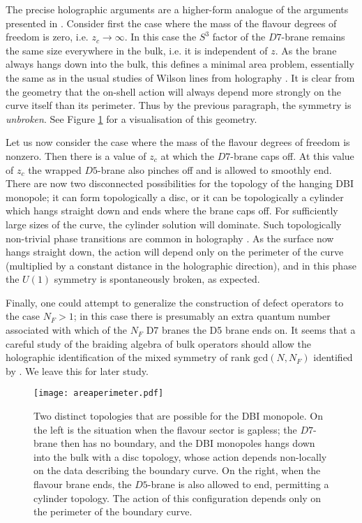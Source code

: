 \documentclass[aps,preprint,nofootinbib,preprintnumbers,eqsecnum,superscriptaddress]{revtex4}
\begin{document}
The precise holographic arguments are a higher-form analogue of the arguments presented in \cite{Iqbal:2014cga}. Consider first the case where the mass of the flavour degrees of freedom is zero, i.e.  $z_c \to \infty$. In this case the $S^3$ factor of the $D7$-brane remains the same size everywhere in the bulk, i.e. it is independent of $z$. As the brane always hangs down into the bulk, this defines a minimal area problem, essentially the same as in the usual studies of Wilson lines from holography \cite{Maldacena:1998im}. It is clear from the geometry that the on-shell action will always depend more strongly on the curve itself than its perimeter. Thus by the previous paragraph, the symmetry is {\it unbroken}. See Figure \ref{fig:areaperimeter} for a visualisation of this geometry. 


Let us now consider the case where the mass of the flavour degrees of freedom is nonzero. Then there is a value of $z_c$ at which the $D7$-brane caps off.  At this value of $z_c$ the wrapped $D5$-brane also pinches off and is allowed to smoothly end. There are now two disconnected possibilities for the topology of the hanging DBI monopole; it can form topologically a disc, or it can be topologically a cylinder which hangs straight down and ends where the brane caps off. For sufficiently large sizes of the curve, the cylinder solution will dominate. Such topologically non-trivial phase transitions are common in holography \cite{Brandhuber:1998bs,Rey:1998bq,Klebanov:2007ws}. As the surface now hangs straight down, the action will depend only on the perimeter of the curve (multiplied by a constant distance in the holographic direction), and in this phase the $U(1)$ symmetry is spontaneously broken, as expected. 

Finally, one could attempt to generalize the construction of defect operators to the case $N_F > 1$; in this case there is presumably an extra quantum number associated with which of the $N_F$ D7 branes the D5 brane ends on. It seems that a careful study of the braiding algebra of bulk operators should allow the holographic identification of the mixed symmetry of rank $\mbox{gcd}(N, N_F)$ identified by \cite{Cherman:2017tey}. We leave this for later study. 

\begin{figure}[h!]
\begin{center}
\texttt{[image: areaperimeter.pdf]}
\caption{\label{fig:areaperimeter}
Two distinct topologies that are possible for the DBI monopole. On the left is the situation when the flavour sector is gapless; the $D7$-brane then has no boundary, and the DBI monopoles hangs down into the bulk with a disc topology, whose action depends non-locally on the data describing the boundary curve. On the right, when the flavour brane ends, the $D5$-brane is also allowed to end, permitting a cylinder topology. The action of this configuration depends only on the perimeter of the boundary curve.}
\end{center}
\end{figure}
\end{document}
